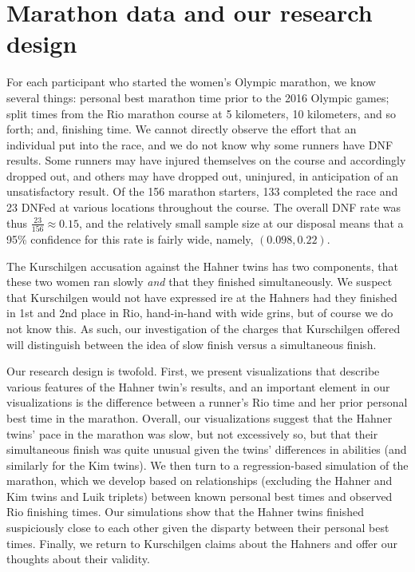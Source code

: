 \documentclass[12pt,titlepage]{article}
\begin{document}
\section*{Marathon data and our research design}

For each participant who started the women's Olympic marathon, we know
several things: personal best marathon time prior to the 2016 Olympic
games; split times from the Rio marathon course at 5 kilometers, 10
kilometers, and so forth; and, finishing time. We cannot directly
observe the effort that an individual put into the race, and we do not
know why some runners have DNF results.  Some runners may have injured
themselves on the course and accordingly dropped out, and others may
have dropped out, uninjured, in anticipation of an unsatisfactory
result. Of the 156 marathon starters, 133 completed the race and 23
DNFed at various locations throughout the course. The overall DNF rate
was thus $\frac{23}{156} \approx 0.15$, and the relatively small
sample size at our disposal means that a 95\% confidence for this rate
is fairly wide, namely, $\left(0.098, 0.22\right)$. 

The Kurschilgen accusation against the Hahner twins has two
components, that these two women ran slowly \emph{and} that they
finished simultaneously.  We suspect that Kurschilgen would not have
expressed ire at the Hahners had they finished in 1st and 2nd place in
Rio, hand-in-hand with wide grins, but of course we do not know this.
As such, our investigation of the charges that Kurschilgen offered
will distinguish between the idea of slow finish versus a simultaneous
finish.

Our research design is twofold.  First, we present visualizations that
describe various features of the Hahner twin's results, and an
important element in our visualizations is the difference between a
runner's Rio time and her prior personal best time in the marathon.
Overall, our visualizations suggest that the Hahner twins' pace in the
marathon was slow, but not excessively so, but that their simultaneous
finish was quite unusual given the twins' differences in abilities
(and similarly for the Kim twins).  We then turn to a regression-based
simulation of the marathon, which we develop based on relationships
(excluding the Hahner and Kim twins and Luik triplets) between known
personal best times and observed Rio finishing times.  Our simulations
show that the Hahner twins finished suspiciously close to each other
given the disparty between their personal best times.  Finally, we
return to Kurschilgen claims about the Hahners and offer our thoughts
about their validity.
\end{document}

